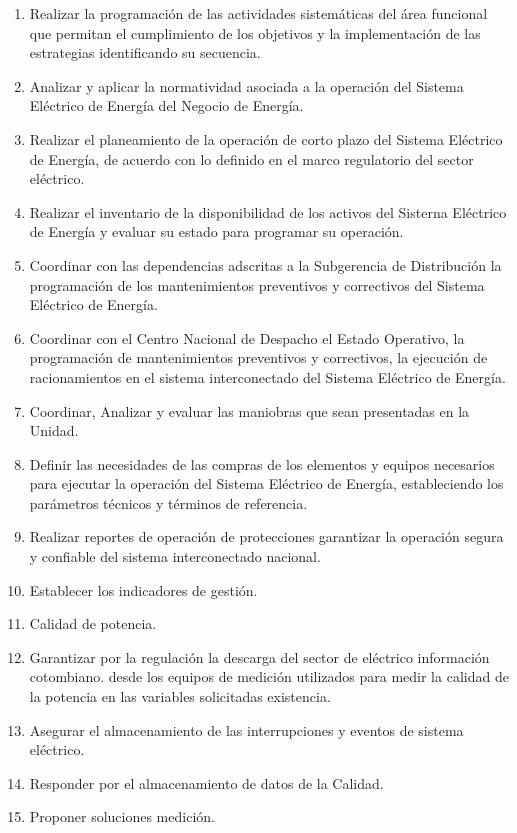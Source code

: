 \documentclass[a5paper]{book}%
\begin{document}
\begin{enumerate}
	\item Realizar la programación de las actividades sistemáticas del área funcional que permitan
	el cumplimiento de los objetivos y la implementación de las estrategias identificando su secuencia.
	\item Analizar y aplicar la normatividad asociada a la operación del Sistema Eléctrico de Energía
	del Negocio de Energía.
	\item Realizar el planeamiento de la operación de corto plazo del Sistema Eléctrico  de Energía, de acuerdo con lo definido en el marco regulatorio del sector eléctrico.
	\item Realizar el inventario de la disponibilidad de los activos del Sisterna Eléctrico  de Energía y evaluar su estado para programar su  operación.
	\item Coordinar con las dependencias adscritas a la Subgerencia de Distribución  la programación de los mantenimientos preventivos y correctivos del Sistema Eléctrico de Energía.
	\item Coordinar con el Centro Nacional de Despacho el Estado  Operativo, la programación de mantenimientos preventivos y correctivos, la ejecución de racionamientos en el sistema interconectado del Sistema Eléctrico de Energía.
	\item Coordinar, Analizar y evaluar las maniobras que sean presentadas en la Unidad.
	\item Definir las necesidades de las compras de los elementos y equipos necesarios para ejecutar la operación del Sistema Eléctrico de Energía, estableciendo los parámetros  técnicos y términos de referencia.
	\item Realizar  reportes de operación  de protecciones garantizar la operación  segura y confiable del sistema interconectado nacional.
	\item Establecer los indicadores de gestión.
	\item Calidad de potencia.
	\item Garantizar por la regulación la descarga del sector de eléctrico información cotombiano.  desde los equipos de medición  utilizados para medir la calidad de la potencia en las variables solicitadas existencia.
	\item Asegurar el almacenamiento de las interrupciones  y eventos  de sistema eléctrico.
	\item Responder  por el almacenamiento de datos de la Calidad.
	\item Proponer  soluciones medición.

\end{enumerate}
\end{document}
